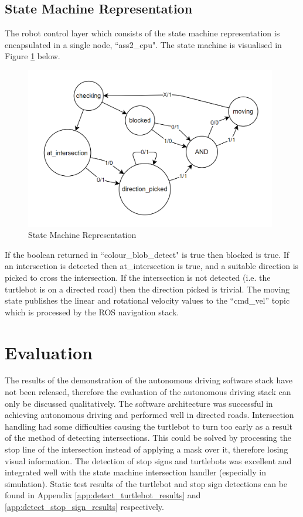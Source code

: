 \documentclass[11pt]{article}
\begin{document}
    \subsection{State Machine Representation}

    The robot control layer which consists of the state machine representation is encapsulated in a single node, ``ass2\_cpu". The state machine is visualised in Figure \ref{fig:state_machine} below.

    \begin{figure}[h!]
        \centering
        \includegraphics[width=110mm]{images/state.png}
        \caption{State Machine Representation}
        \label{fig:state_machine}
    \end{figure}

    If the boolean returned in ``colour\_blob\_detect" is true then blocked is true. If an intersection is detected then at\_intersection is true, and a suitable direction is picked to cross the intersection. If the intersection is not detected (i.e. the turtlebot is on a directed road) then the direction picked is trivial. The moving state publishes the linear and rotational velocity values to the ``cmd\_vel'' topic which is processed by the ROS navigation stack.

\section{Evaluation}
\label{sec:evaluation}

    The results of the demonstration of the autonomous driving software stack have not been released, therefore the evaluation of the autonomous driving stack can only be discussed qualitatively. The software architecture was successful in achieving autonomous driving and performed well in directed roads. Intersection handling had some difficulties causing the turtlebot to turn too early as a result of the method of detecting intersections. This could be solved by processing the stop line of the intersection instead of applying a mask over it, therefore losing visual information. The detection of stop signs and turtlebots was excellent and integrated well with the state machine intersection handler (especially in simulation). Static test results of the turtlebot and stop sign detections can be found in Appendix \ref{app:detect_turtlebot_results} and \ref{app:detect_stop_sign_results} respectively.
\end{document}
